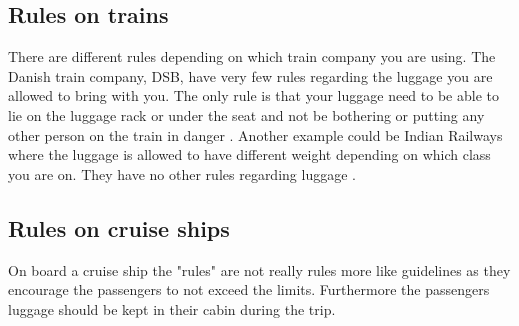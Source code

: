 \subsection{Rules on trains}

There are different rules depending on which train company you are using. 
\newline
The Danish train company, DSB, have very few rules regarding the luggage you are allowed to bring with you. 
\newline\newline
The only rule is that your luggage need to be able to lie on the luggage rack or under the seat and not be bothering or putting any other person on the train in danger \citep{rulestrain}.
\newline\newline
Another example could be Indian Railways where the luggage is allowed to have different weight depending on which class you are on. They have no other rules regarding luggage \citep{idianrules}.

\subsection{Rules on cruise ships}
On board a cruise ship the "rules" are not really rules more like guidelines as they encourage the passengers to not exceed the limits. Furthermore the passengers luggage should be kept in their cabin during the trip\citep{Cruise}.
